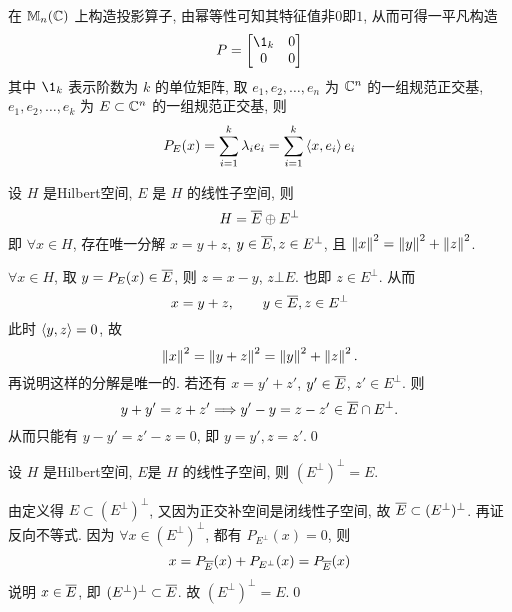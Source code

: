         \begin{Example}
            在 $ \mathbb{M}_{n}(\C) $ 上构造投影算子, 由幂等性可知其特征值非$0$即$1$, 从而可得一平凡构造
            \[
                P=\begin{bmatrix}
                    \1_{k} & 0 \\
                    0 & 0
                \end{bmatrix}
            \]
            其中 $ \1_{k} $ 表示阶数为 $ k $ 的单位矩阵, 取 $ e_{1}, e_{2},\dots,e_{n} $ 为 $ \C^{n} $ 的一组规范正交基, $ e_{1}, e_{2},\dots,e_{k} $ 为 $ E\subset\C^{n} $ 的一组规范正交基, 则
            \[
                P_{E}(x)=\sum_{i=1}^{k}\lambda_{i}e_{i}=\sum_{i=1}^{k}\lrangle{x, e_{i}}e_{i}
            \]
        \end{Example}

    \begin{Corollary}[正交分解]
        设 $ H $ 是Hilbert空间, $ E $ 是 $ H $ 的线性子空间, 则
        \[
            H=\baro{E}\oplus E^{\bot}
        \]
        即 $ \forall x\in H $, 存在唯一分解 $ x=y+z $, $ y\in\baro{E}, z\in E^{\bot} $, 且 $ \norm{x}^{2}=\norm{y}^{2}+\norm{z}^{2} $.
    \end{Corollary}

    \begin{Proof}
        $ \forall x\in H $, 取 $ y=P_{E}(x)\in \baro{E} $, 则 $ z=x-y $, $ z\bot E $. 也即 $ z\in E^{\bot} $. 从而
        \[
            x=y+z, \qquad y\in \baro{E}, z\in E^{\bot}
        \]
        此时 $ \lrangle{y, z}=0 $, 故
        \[
            \norm{x}^{2}=\norm{y+z}^{2}=\norm{y}^{2}+\norm{z}^{2}.
        \]
        再说明这样的分解是唯一的. 若还有 $ x=y'+z' $, $ y'\in\baro{E} $, $ z'\in E^{\bot} $. 则
        \[
            y+y'=z+z' \Longrightarrow y'-y=z-z'\in \baro{E}\cap E^{\bot}.
        \]
        从而只能有 $ y-y'=z'-z=0 $, 即 $ y=y', z=z' $.\qed
    \end{Proof}

    \begin{Corollary}
        设 $ H $ 是Hilbert空间, $ E $是 $ H $ 的线性子空间, 则 $ (E^{\bot})^{\bot}=E $.
    \end{Corollary}

    \begin{Proof}
        由定义得 $ E\subset (E^{\bot})^{\bot} $, 又因为正交补空间是闭线性子空间, 故 $ \baro{E}\subset (E^{\bot})^{\bot} $. 再证反向不等式. 因为 $ \forall x\in(E^{\bot})^{\bot}  $, 都有 $ P_{E^{\bot}}(x)=0 $, 则
        \[
            x=P_{\baro{E}}(x)+P_{E^{\bot}}(x)=P_{\baro{E}}(x)
        \]
        说明 $ x\in\baro{E} $, 即 $ (E^{\bot})^{\bot}\subset \baro{E} $. 故 $ (E^{\bot})^{\bot}=E $.\qed
    \end{Proof}

